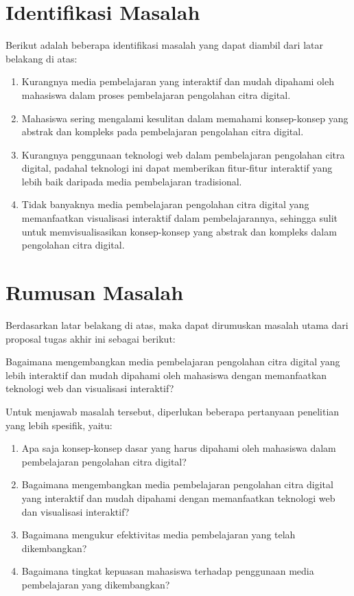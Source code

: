\section{Identifikasi Masalah}
Berikut adalah beberapa identifikasi masalah yang dapat diambil dari latar belakang di atas:

\begin{enumerate}
  \item Kurangnya media pembelajaran yang interaktif dan mudah dipahami oleh mahasiswa dalam proses pembelajaran pengolahan citra digital.
  \item Mahasiswa sering mengalami kesulitan dalam memahami konsep-konsep yang abstrak dan kompleks pada pembelajaran pengolahan citra digital.
  \item Kurangnya penggunaan teknologi web dalam pembelajaran pengolahan citra digital, padahal teknologi ini dapat memberikan fitur-fitur interaktif yang lebih baik daripada media pembelajaran tradisional.
  \item Tidak banyaknya media pembelajaran pengolahan citra digital yang memanfaatkan visualisasi interaktif dalam pembelajarannya, sehingga sulit untuk memvisualisasikan konsep-konsep yang abstrak dan kompleks dalam pengolahan citra digital.
\end{enumerate}

\section{Rumusan Masalah}
Berdasarkan latar belakang di atas, maka dapat dirumuskan masalah utama dari proposal tugas akhir ini sebagai berikut:

Bagaimana mengembangkan media pembelajaran pengolahan citra digital yang lebih interaktif dan mudah dipahami oleh mahasiswa dengan memanfaatkan teknologi web dan visualisasi interaktif?

Untuk menjawab masalah tersebut, diperlukan beberapa pertanyaan penelitian yang lebih spesifik, yaitu:

\begin{enumerate}
    \item Apa saja konsep-konsep dasar yang harus dipahami oleh mahasiswa dalam pembelajaran pengolahan citra digital?
    \item Bagaimana mengembangkan media pembelajaran pengolahan citra digital yang interaktif dan mudah dipahami dengan memanfaatkan teknologi web dan visualisasi interaktif?
    \item Bagaimana mengukur efektivitas media pembelajaran yang telah dikembangkan?
    \item Bagaimana tingkat kepuasan mahasiswa terhadap penggunaan media pembelajaran yang dikembangkan?
\end{enumerate}

